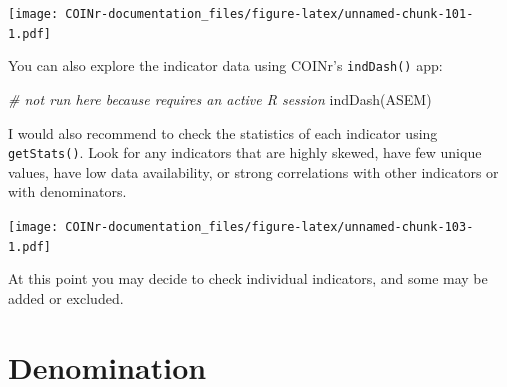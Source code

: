 \documentclass[
]{book}
\newenvironment{Shaded}{\begin{snugshade}}{\end{snugshade}}
\newcommand{\AttributeTok}[1]{\textcolor[rgb]{0.77,0.63,0.00}{#1}}
\newcommand{\CommentTok}[1]{\textcolor[rgb]{0.56,0.35,0.01}{\textit{#1}}}
\newcommand{\DocumentationTok}[1]{\textcolor[rgb]{0.56,0.35,0.01}{\textbf{\textit{#1}}}}
\newcommand{\FunctionTok}[1]{\textcolor[rgb]{0.00,0.00,0.00}{#1}}
\newcommand{\NormalTok}[1]{#1}
\newcommand{\OtherTok}[1]{\textcolor[rgb]{0.56,0.35,0.01}{#1}}
\newcommand{\SpecialCharTok}[1]{\textcolor[rgb]{0.00,0.00,0.00}{#1}}
\newcommand{\StringTok}[1]{\textcolor[rgb]{0.31,0.60,0.02}{#1}}
\begin{document}
\texttt{[image: COINr-documentation\_files/figure-latex/unnamed-chunk-101-1.pdf]}

You can also explore the indicator data using COINr's \texttt{indDash()} app:

\begin{Shaded}
\begin{Highlighting}[]
\CommentTok{\# not run here because requires an active R session}
\FunctionTok{indDash}\NormalTok{(ASEM)}
\end{Highlighting}
\end{Shaded}

I would also recommend to check the statistics of each indicator using \texttt{getStats()}. Look for any indicators that are highly skewed, have few unique values, have low data availability, or strong correlations with other indicators or with denominators.

\begin{Shaded}
\end{Shaded}

\texttt{[image: COINr-documentation\_files/figure-latex/unnamed-chunk-103-1.pdf]}

At this point you may decide to check individual indicators, and some may be added or excluded.

\hypertarget{denomination-1}{%
\section{Denomination}\label{denomination-1}}
\end{document}

